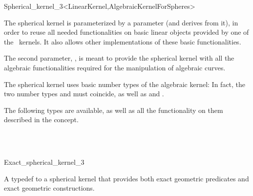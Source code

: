 \begin{ccRefClass}{Spherical_kernel_3<LinearKernel,AlgebraicKernelForSpheres>}


\ccIsModel


\ccParameters

The spherical kernel is parameterized by a  parameter
(and derives from it), in order to reuse all needed functionalities on
basic linear objects provided by one of the \cgal\ kernels. It also
allows other implementations of these basic functionalities.

The second parameter, , is meant to provide the
spherical kernel with all the algebraic functionalities required for the
manipulation of algebraic curves. 

\ccInheritsFrom


\ccTypes

\ccThreeToTwo

The spherical kernel uses basic number types of the algebraic kernel:
In fact, the two number types  and
 must coincide, as well as
 and .

The following types are available, as well as all the functionality on
them described in the  concept. 

\ccGlue
{}
\ccGlue
{}
\ccGlue
{}

\ccSeeAlso

\\
\\

\end{ccRefClass}
\begin{ccRefClass}{Exact_spherical_kernel_3}


\ccDefinition

A typedef to a spherical kernel that provides
both exact geometric predicates and exact geometric constructions.

\ccIsModel


\ccSeeAlso


\end{ccRefClass}
